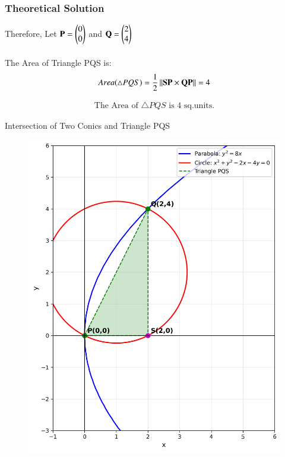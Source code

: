\documentclass{beamer}
\begin{document}
\begin{frame}[fragile]
\frametitle{Theoretical Solution}
 
Therefore,
Let $\mathbf{P} = \begin{pmatrix}0 \\ 0\end{pmatrix}$ and $\mathbf{Q} = \begin{pmatrix}2 \\ 4\end{pmatrix}$\\\\

The Area of Triangle PQS is:
\begin{equation}
    Area(\triangle PQS) = \dfrac{1}{2}\left\lVert\mathbf{SP} \times \mathbf{QP}\right\rVert = 4
\end{equation}

\begin{align*}
    \boxed{\text{The Area of $\triangle PQS$ is 4 sq.units.}}
\end{align*}
\end{frame}


\begin{frame}{Intersection of Two Conics and Triangle PQS}
\begin{figure}
   \centering
    \includegraphics[width=\columnwidth, height=0.8\textheight, keepaspectratio]{figs/fig1.png}
    \label{fig:Beamer/figs/fig1.png}
\end{figure}
\end{frame}
\end{document}
